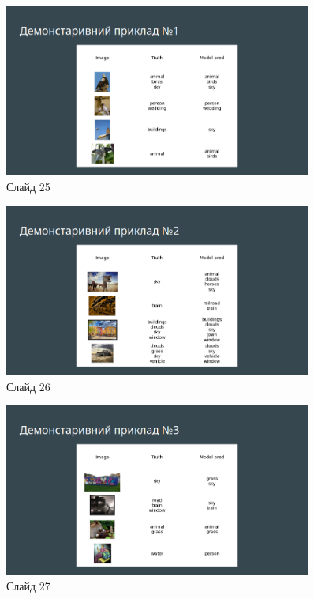 \documentclass{udstu}
\begin{document}
\begin{figure}[!ht]
	\centering
	\includegraphics[width=0.9\textwidth]{PNG/present/present-25}
	\caption{Слайд 25}
\end{figure}

\begin{figure}[!ht]
	\centering
	\includegraphics[width=0.9\textwidth]{PNG/present/present-26}
	\caption{Слайд 26}
\end{figure}

\begin{figure}[!ht]
	\centering
	\includegraphics[width=0.9\textwidth]{PNG/present/present-27}
	\caption{Слайд 27}
\end{figure}
\end{document}
